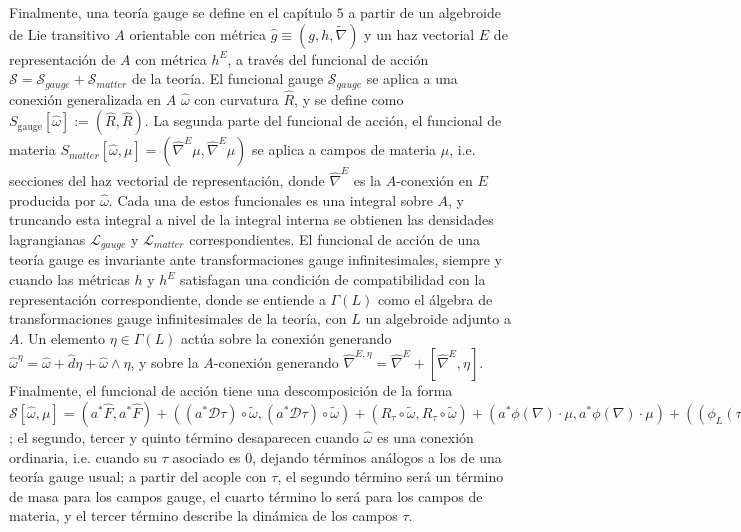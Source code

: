 Finalmente, una teoría gauge se define en el capítulo $5$ a partir de un algebroide de Lie transitivo $A$ orientable con métrica $\hat g \equiv (g, h, \tilde \nabla)$ y un haz vectorial $E$ de representación de $A$ con métrica $h^E$, a través del funcional de acción $\mathcal S = \mathcal S_{gauge} + \mathcal S_{matter}$ de la teoría. El funcional gauge $\mathcal S_{gauge}$ se aplica a una conexión generalizada en $A$ $\hat \omega$ con curvatura $\hat R$, y se define como $S_\text{gauge}[\hat \omega] := (\hat R, \hat R)$. La segunda parte del funcional de acción, el funcional de materia $S_{matter}[\hat \omega, \mu] = (\hat \nabla^E \mu, \hat \nabla^E \mu)$ se aplica a campos de materia $\mu$, i.e. secciones del haz vectorial de representación, donde $\hat \nabla^E$ es la $A$-conexión en $E$ producida por $\hat \omega$. Cada una de estos funcionales es una integral sobre $A$, y truncando esta integral a nivel de la integral interna se obtienen las densidades lagrangianas $\mathcal L_{gauge}$ y $\mathcal L_{matter}$ correspondientes. El funcional de acción de una teoría gauge es invariante ante transformaciones gauge infinitesimales, siempre y cuando las métricas $h$ y $h^E$ satisfagan una condición de compatibilidad con la representación correspondiente, donde se entiende a $\Gamma(L)$ como el álgebra de transformaciones gauge infinitesimales de la teoría, con $L$ un algebroide adjunto a $A$. Un elemento $\eta \in \Gamma(L)$ actúa sobre la conexión generando $\hat \omega^\eta = \hat \omega + \hat d\eta + \hat \omega \wedge \eta$, y sobre la $A$-conexión generando $\hat \nabla^{E, \eta} = \hat \nabla^E + [\hat \nabla^E, \eta]$. Finalmente, el funcional de acción tiene una descomposición de la forma $\mathcal S[\hat \omega, \mu] = (a^* \hat F, a^* \hat F) + ((a^* \mathcal D \tau) \circ \tilde \omega, (a^* \mathcal D \tau) \circ \tilde \omega) + (R_\tau \circ \tilde \omega, R_\tau \circ \tilde \omega) + (a^* \phi(\nabla)\cdot \mu, a^* \phi(\nabla)\cdot \mu) + ((\phi_L(\tau)\mu)\circ \tilde \omega, (\phi_L(\tau)\mu)\circ \tilde \omega)$; el segundo, tercer y quinto término desaparecen cuando $\hat \omega$ es una conexión ordinaria, i.e. cuando su $\tau$ asociado es $0$, dejando términos análogos a los de una teoría gauge usual; a partir del acople con $\tau$, el segundo término será un término de masa para los campos gauge, el cuarto término lo será para los campos de materia, y el tercer término describe la dinámica de los campos $\tau$.